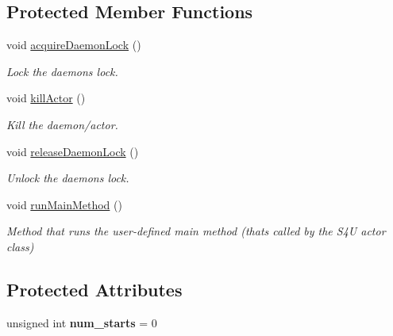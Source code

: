 \subsection*{Protected Member Functions}
\begin{DoxyCompactItemize}
\item 
\mbox{\label{classwrench_1_1_s4_u___daemon_a438a44d941326d6df21d56ec1579f688}} 
void \hyperlink{classwrench_1_1_s4_u___daemon_a438a44d941326d6df21d56ec1579f688}{acquire\+Daemon\+Lock} ()
\begin{DoxyCompactList}\small\item\em Lock the daemon\textquotesingle{}s lock. \end{DoxyCompactList}\item 
\mbox{\label{classwrench_1_1_s4_u___daemon_afb9bb97186d92374fa8cb16dbc1c6737}} 
void \hyperlink{classwrench_1_1_s4_u___daemon_afb9bb97186d92374fa8cb16dbc1c6737}{kill\+Actor} ()
\begin{DoxyCompactList}\small\item\em Kill the daemon/actor. \end{DoxyCompactList}\item 
\mbox{\label{classwrench_1_1_s4_u___daemon_a872a3739833bc4034fe729877c258dcd}} 
void \hyperlink{classwrench_1_1_s4_u___daemon_a872a3739833bc4034fe729877c258dcd}{release\+Daemon\+Lock} ()
\begin{DoxyCompactList}\small\item\em Unlock the daemon\textquotesingle{}s lock. \end{DoxyCompactList}\item 
\mbox{\label{classwrench_1_1_s4_u___daemon_a2f2a5b056c6f2f19e6b4b8787eab9d9d}} 
void \hyperlink{classwrench_1_1_s4_u___daemon_a2f2a5b056c6f2f19e6b4b8787eab9d9d}{run\+Main\+Method} ()
\begin{DoxyCompactList}\small\item\em Method that run\textquotesingle{}s the user-\/defined main method (that\textquotesingle{}s called by the S4U actor class) \end{DoxyCompactList}\end{DoxyCompactItemize}
\subsection*{Protected Attributes}
\begin{DoxyCompactItemize}
\item 
\mbox{\label{classwrench_1_1_s4_u___daemon_a5e82a7fff4263a9a7615f07b1fe98df1}} 
unsigned int {\bfseries num\+\_\+starts} = 0
\end{DoxyCompactItemize}


